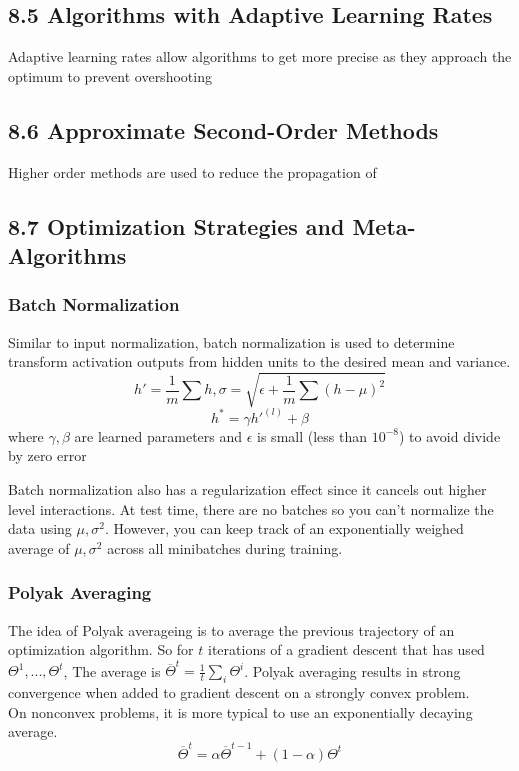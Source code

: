 \documentclass[a4paper]{report}
\begin{document}
\subsection{8.5 Algorithms with Adaptive Learning Rates}
Adaptive learning rates allow algorithms to get more precise as they approach the optimum to prevent overshooting

\subsection{8.6 Approximate Second-Order Methods}
Higher order methods are used to reduce the propagation of

\subsection{8.7 Optimization Strategies and Meta-Algorithms}

\subsubsection{Batch Normalization}
Similar to input normalization, batch normalization is used to determine transform activation outputs from hidden units to the desired mean and variance.
$$h'=\frac{1}{m}\sum h, \sigma=\sqrt{\epsilon + \frac{1}{m}\sum(h-\mu)^2}$$
$$h^*=\gamma h'^{(l)}+\beta$$
where $\gamma,\beta$ are learned parameters and $\epsilon$ is small (less than $10^{-8}$) to avoid divide by zero error

Batch normalization also has a regularization effect since it cancels out higher level interactions. At test time, there are no batches so you can't normalize the data using $\mu,\sigma^2$. However, you can keep track of an exponentially weighed average of $\mu, \sigma^2$ across all minibatches during training.

\subsubsection{Polyak Averaging}
The idea of Polyak averageing is to average the previous trajectory of an optimization algorithm. So for $t$ iterations of a gradient descent that has used $\Theta^1,...,\Theta^t$, The average is $\overline{\Theta}^t=\frac{1}{t}\sum_i\Theta^i$. Polyak averaging results in strong convergence when added to gradient descent on a strongly convex problem.\\
On nonconvex problems, it is more typical to use an exponentially decaying average.
$$\overline{\Theta}^t=\alpha\overline{\Theta}^{t-1}+(1-\alpha)\Theta^t$$
\end{document}
